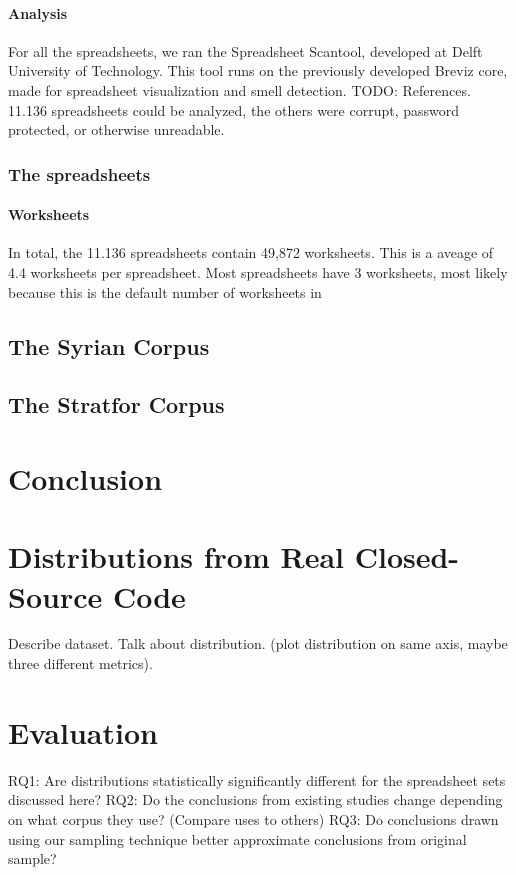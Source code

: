 \documentclass{sig-alternate} %
\begin{document}
\paragraph{Analysis}
For all the spreadsheets, we ran the Spreadsheet Scantool, developed at Delft University of Technology. This tool runs on the previously developed Breviz core, made for spreadsheet visualization and smell detection. TODO: References. 11.136 spreadsheets could be analyzed, the others were corrupt, password protected, or otherwise unreadable.

\subsubsection{The spreadsheets}
\paragraph{Worksheets}
In total, the 11.136 spreadsheets contain 49,872 worksheets. This is a aveage of 4.4 worksheets per spreadsheet. Most spreadsheets have 3 worksheets, most likely because this is the default number of worksheets in 

\subsection{The Syrian Corpus}

\subsection{The Stratfor Corpus}



\section{Conclusion}

\section{Distributions from Real Closed-Source Code}

Describe dataset.
Talk about distribution. (plot distribution on same axis, maybe three different metrics).

\section{Evaluation}

RQ1: Are distributions statistically significantly different for the spreadsheet sets discussed here?
RQ2: Do the conclusions from existing studies change depending on what corpus they use? (Compare uses to others)
RQ3: Do conclusions drawn using our sampling technique better approximate conclusions from original sample?
\end{document}
